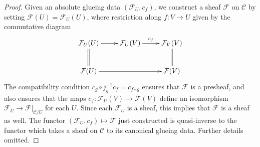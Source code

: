 \documentclass[10pt,a4paper]{amsart}
\theoremstyle{plain}
\theoremstyle{definition}
\theoremstyle{remark}
\numberwithin{equation}{subsection}
\begin{document}
\begin{proof}
Given an absolute glueing data $(\mathcal{F}_U, c_f)$,
we construct a sheaf $\mathcal{F}$ on $\mathcal{C}$ by
setting $\mathcal{F}(U) = \mathcal{F}_U(U)$, where restriction
along $f : V \to U$ given by the commutative diagram
$$
\xymatrix{
\mathcal{F}_U(U) \ar[r] \ar@{=}[d] &
\mathcal{F}_U(V) \ar[r]^{c_f} &
\mathcal{F}_V(V) \ar@{=}[d] \\
\mathcal{F}(U) \ar[rr] &  &
\mathcal{F}(V)
}
$$
The compatibility condition $c_g \circ j_{g}^{-1} c_f = c_{f \circ g}$
ensures that $\mathcal{F}$ is a presheaf, and also ensures that the maps
$c_f : \mathcal{F}_U(V) \to \mathcal{F}(V)$ define an isomorphism
$\mathcal{F}_U \to \mathcal{F}|_{\mathcal{C}/U}$ for each $U$.
Since each $\mathcal{F}_U$ is a sheaf, this implies that $\mathcal{F}$
is a sheaf as well. The functor $(\mathcal{F}_U, c_f) \mapsto \mathcal{F}$
just constructed is quasi-inverse to the functor which takes a sheaf
on $\mathcal{C}$ to its canonical glueing data. Further details omitted.
\end{proof}
\end{document}
